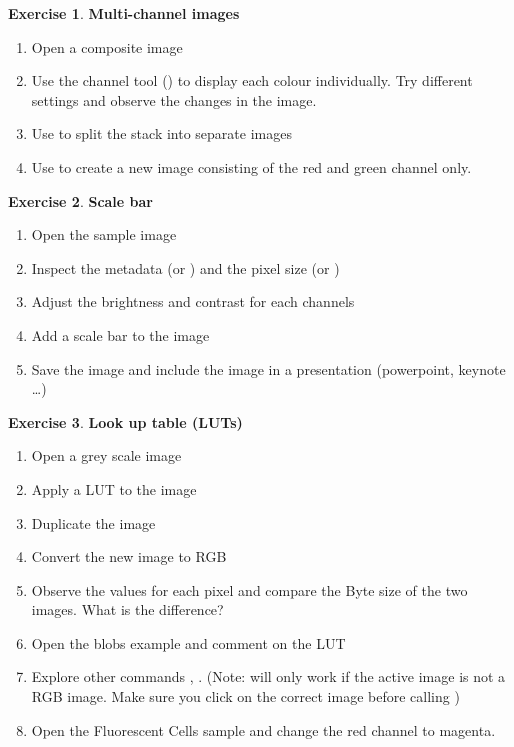 \documentclass[xcolor=table,DIV=19,twocolumn]{scrartcl}
\theoremstyle{definition}
\newtheorem{exercice}{Exercise}
\begin{document}
\begin{exercice} \textbf{Multi-channel images}
  \begin{enumerate}
  \item Open a composite image 
  \item Use the channel tool () to display each colour individually. Try different settings and observe the changes in the image.
  \item Use  to split the stack into separate images
  \item Use  to create a new image consisting of the red and green channel only.
  \end{enumerate}
\end{exercice}

\begin{exercice} \textbf{Scale bar}
  \begin{enumerate}
  \item Open the sample image 
  \item Inspect the metadata  (or ) and the pixel size  (or )
  \item Adjust the brightness and contrast for each channels
  \item Add a scale bar to the image
  \item Save the image and include the image in a presentation (powerpoint, keynote \dots)
  \end{enumerate}
\end{exercice}


\begin{exercice} \textbf{Look up table (LUTs)}
  \begin{enumerate}
  \item Open a grey scale image 
  \item Apply a LUT to the image 
  \item Duplicate the image 
  \item Convert the new image to RGB 
  \item Observe the values for each pixel and compare the Byte size of the two images. What is the difference?
  \item Open the blobs example  and
    comment on the LUT
  \item Explore other commands ,
    . (Note:  will only work if the active image  is not a RGB image. Make sure you click on the correct image before calling )
  \item Open the Fluorescent Cells sample and change the red channel
    to magenta.
  \end{enumerate}
\end{exercice}
\end{document}
